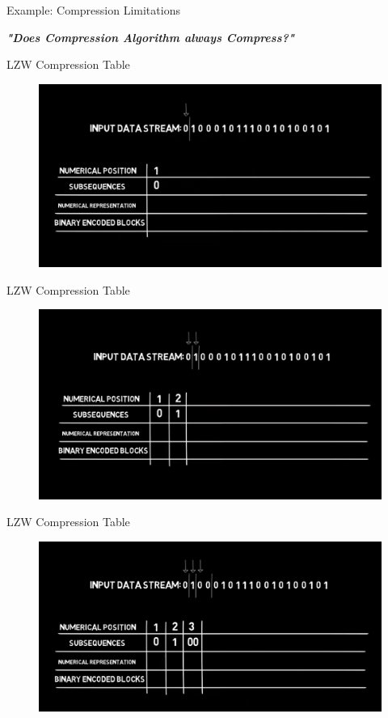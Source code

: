 \documentclass{beamer}
\begin{document}
\begin{frame}{Example: Compression Limitations}
    \begin{alertblock}{}
        \centering
        \textbf{\textit{"Does Compression Algorithm always Compress?"}}
    \end{alertblock}
\end{frame}
\begin{frame}[fragile]{LZW Compression Table}
\begin{figure}
\centering
\includegraphics[width=\textwidth]{assets/1.png}
\end{figure}
\end{frame}
\begin{frame}[fragile]{LZW Compression Table}
\begin{figure}
\centering
\includegraphics[width=\textwidth]{assets/2.png}
\end{figure}
\end{frame}
\begin{frame}[fragile]{LZW Compression Table}
\begin{figure}
\centering
\includegraphics[width=\textwidth]{assets/3.png}
\end{figure}
\end{frame}
\end{document}
